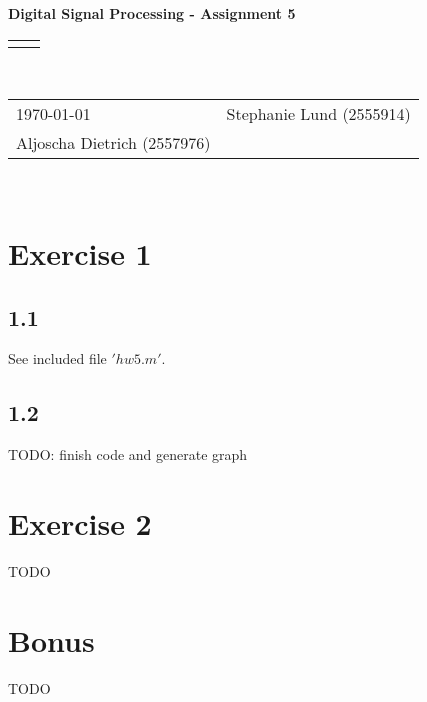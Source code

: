 \documentclass[12pt]{article}
\renewcommand{\title}[1]{\textbf{#1}\\}
\renewcommand{\line}{\begin{tabularx}{\textwidth}{X>{\raggedleft}X}\hline\\\end{tabularx}\\[-0.5cm]}
\newcommand{\leftright}[2]{\begin{tabularx}{\textwidth}{X>{\raggedleft}X}#1%
& #2\\\end{tabularx}\\[-0.5cm]}
\begin{document}
\title{Digital Signal Processing - Assignment 5}
\line
\leftright{\today}{Stephanie Lund (2555914)\\Aljoscha Dietrich (2557976)} %

\section*{Exercise 1}

\subsection*{1.1}
See included file $'hw5.m'$.

\subsection*{1.2}
TODO: finish code and generate graph

\section*{Exercise 2}
TODO

\section*{Bonus}
TODO
\end{document}
